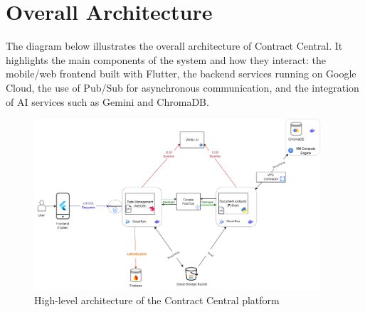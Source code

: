 \section{Overall Architecture}

The diagram below illustrates the overall architecture of Contract Central. It highlights the main components of the system and how they interact: the mobile/web frontend built with Flutter, the backend services running on Google Cloud, the use of Pub/Sub for asynchronous communication, and the integration of AI services such as Gemini and ChromaDB.

\begin{figure}[H]
    \centering
    \includegraphics[width=0.95\textwidth]{architecture-contract-central.png}
    \caption{High-level architecture of the Contract Central platform}
    \label{fig:architecture}
\end{figure}
